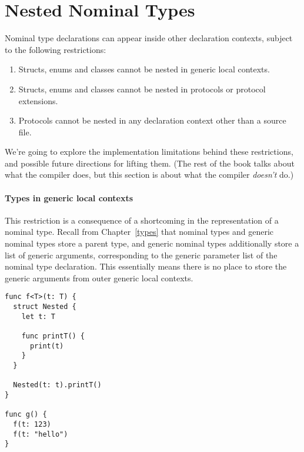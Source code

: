 \documentclass[a4paper,headsepline,bibliography=totoc,toc=flat,fleqn,twoside=semi]{scrbook}
\theoremstyle{definition}
\theoremstyle{definition}
\theoremstyle{definition}
\begin{document}
\section{Nested Nominal Types}\label{nested nominal types}

Nominal type declarations can appear inside other declaration contexts, subject to the following restrictions:
\begin{enumerate}
\item Structs, enums and classes cannot be nested in generic local contexts.
\item Structs, enums and classes cannot be nested in protocols or protocol extensions.
\item Protocols cannot be nested in any declaration context other than a source file.
\end{enumerate}
We're going to explore the implementation limitations behind these restrictions, and possible future directions for lifting them. (The rest of the book talks about what the compiler does, but this section is about what the compiler \emph{doesn't} do.)

\paragraph{Types in generic local contexts} This restriction is a consequence of a shortcoming in the representation of a nominal type. Recall from Chapter~\ref{types} that nominal types and generic nominal types store a parent type, and generic nominal types additionally store a list of generic arguments, corresponding to the generic parameter list of the nominal type declaration. This essentially means there is no place to store the generic arguments from outer generic local contexts.

\begin{listing}\label{nominal type in generic local context}
\begin{Verbatim}
func f<T>(t: T) {
  struct Nested {
    let t: T

    func printT() {
      print(t)
    }
  }
  
  Nested(t: t).printT()
}

func g() {
  f(t: 123)
  f(t: "hello")
}
\end{Verbatim}
\end{listing}
\end{document}
